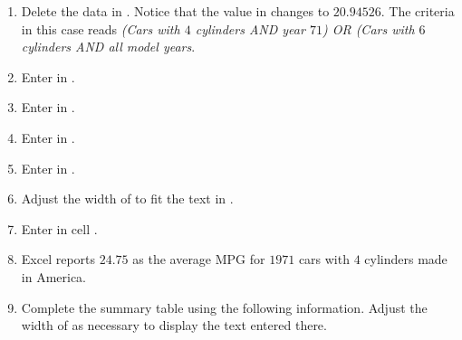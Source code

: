 \begin{enumerate}[resume]

	\item Delete the data in . Notice that the value in  changes to $ 20.94526 $. The criteria in this case reads \textit{(Cars with $ 4 $ cylinders AND year $ 71 $) OR (Cars with $ 6 $ cylinders AND all model years}. 
	\item Enter  in .
	\item Enter  in .
	\item Enter  in .
	\item Enter  in .
	\item Adjust the width of  to fit the text in .
	\item Enter  in cell .
	\item Excel reports $ 24.75 $ as the average MPG for $ 1971 $ cars with $ 4 $ cylinders made in America. 
	
	\item Complete the summary table using the following information. Adjust the width of  as necessary to display the text entered there.
	
\end{enumerate}	

